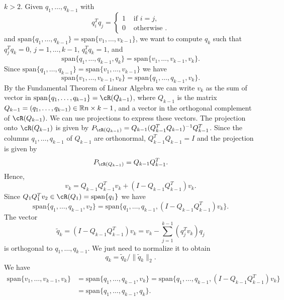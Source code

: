 \documentclass{article}
\providecommand{\real}[1]{\mathbb{R}}
\begin{document}
\begin{list}{}{}
\item[$k>2$.]
Given $q_1, \ldots, q_{k-1}$ with
\[
          q_i^T q_j = \left\{ \begin{array}{ll}
                                       1 & \mbox{ if } i=j, \\
                                       0 & \mbox{ otherwise }.
                               \end{array} \right.
\]
and $\mbox{span} \{ q_1, \ldots, q_{k-1} \} = \mbox{span} \{ v_1,  \ldots, v_{k-1} \}$, we want to compute
$q_k$ such that $q_j^Tq_k = 0$, $j = 1, \ldots, k-1$, $q_k^Tq_k=1$, and
\[
         \mbox{span} \{ q_1, \ldots, q_{k-1}, q_k \} = \mbox{span} \{ v_1,  \ldots, v_{k-1}, v_k \}.
\]
Since $\mbox{span} \{ q_1, \ldots, q_{k-1}  \} = \mbox{span} \{ v_1,  \ldots, v_{k-1} \}$ we have 
\[
         \mbox{span} \{ v_1,  \ldots, v_{k-1}, v_k \} = \mbox{span} \{ q_1, \ldots, q_{k-1}, v_k \}.
\]
By the Fundamental Theorem of Linear Algebra we can write $v_k$ as the sum of  vector
in $\mbox{span} \{  q_1, \ldots, q_{k-1}  \}  = \cR(Q_{k-1})$, where $Q_{k-1}$ is the matrix 
$Q_{k-1} = ( q_1, \ldots, q_{k-1}) \in \real^{n\times k-1}$, 
and a vector in the orthogonal complement of $\cR(Q_{k-1})$.
We can use projections to express these vectors. The projection onto  $\cR(Q_{k-1})$ is given by
$P_{\cR(Q_{k-1})}= Q_{k-1} (Q_{k-1}^TQ_{k-1})^{-1} Q_{k-1}^T$. Since the columns
$q_1, \ldots, q_{k-1}$ of $Q_{k-1}$ are orthonormal, $Q_{k-1}^TQ_{k-1} =I$ and the projection is
given by
\[
         P_{\cR(Q_{k-1})}= Q_{k-1}Q_{k-1}^T.
\]
Hence,
\[
     v_k =  Q_{k-1}Q_{k-1}^T v_k + (I-Q_{k-1}Q_{k-1}^T) v_k.
\]
Since $Q_1Q_1^T v_2 \in \cR(Q_1) = \mbox{span} \{ q_1 \}$ we have
\[
       \mbox{span} \{ q_1, \ldots, q_{k-1}, v_2 \} =   \mbox{span} \{ q_1, \ldots, q_{k-1},  (I-Q_{k-1}Q_{k-1}^T) v_k\}.
\]
The vector 
\[
       \widetilde{q}_k =  (I-Q_{k-1}Q_{k-1}^T) v_k  = v_k - \sum_{j=1}^{k-1} (q_j^Tv_k) q_j
\]
is orthogonal to $ q_1, \ldots, q_{k-1}$. We just need to normalize it to obtain 
\[
       q_k =   \widetilde{q}_k / \| \widetilde{q}_k \|_2.
\]
We have
\begin{align*}
             \mbox{span} \{ v_1,  \ldots, v_{k-1}, v_k \} 
             &= \mbox{span} \{ q_1, \ldots, q_{k-1}, v_k \}
             =  \mbox{span} \{ q_1, \ldots, q_{k-1},  (I-Q_{k-1}Q_{k-1}^T) v_k\} \\
             &=   \mbox{span} \{ q_1, \ldots, q_{k-1},  q_k\}.
\end{align*}
\end{list}
\end{document}
